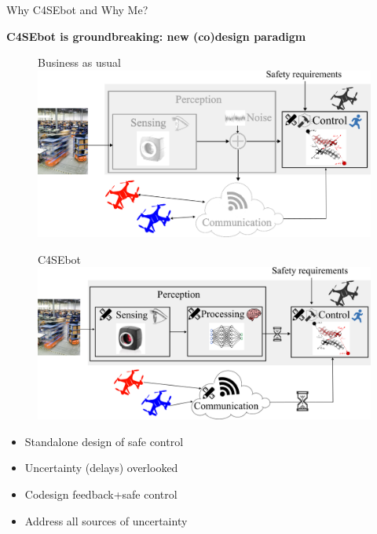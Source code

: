 \documentclass[10pt,xcolor={dvipsnames}]{beamer}
\begin{document}
	\begin{frame}{Why C4SEbot and Why Me?}
		
		\textbf{C4SEbot is groundbreaking: new (co)design paradigm}\vspace{2mm}
		
		\begin{figure}
			\centering
			\begin{minipage}[l]{.49\linewidth}
				\centering
				Business as usual\vspace{2mm}\\
				\includegraphics[height=.48\linewidth]{scheme_bau}
			\end{minipage}
			\hfil
			\begin{minipage}[r]{.49\linewidth}
				\centering
				C4SEbot\vspace{2mm}\\
				\includegraphics[height=.48\linewidth]{scheme_robust_codesign_comm}
			\end{minipage}
		\end{figure}
		
		\begin{minipage}[l]{.5\linewidth}
			\begin{itemize}[label=\faThumbsODown]
				\item Standalone design of safe control
				\item Uncertainty (delays) overlooked
			\end{itemize}
		\end{minipage}%
		\begin{minipage}[r]{.5\linewidth}
			\begin{itemize}[label=\faThumbsOUp]
				\item Codesign feedback+safe control
				\item Address all sources of uncertainty
			\end{itemize}
		\end{minipage}
		

\end{frame}
\end{document}
